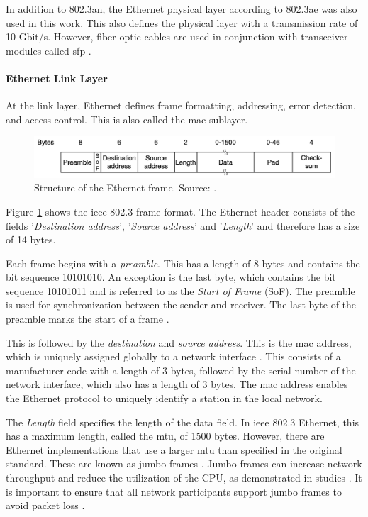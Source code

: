 In addition to 802.3an, the Ethernet physical layer according to 802.3ae was also used in this work. This also defines the physical layer with a transmission rate of 10 Gbit/s. However, fiber optic cables are used in conjunction with transceiver modules called \ac{sfp} \cite{10GigabitEthernet}.

\paragraph{Ethernet Link Layer} \label{chap:EthLinkLayer}
At the link layer, Ethernet defines frame formatting, addressing, error detection, and access control. This is also called the \ac{mac} sublayer.

\begin{figure}[h]
    \centering
    \includegraphics[width=1\linewidth]{figures/tcpip_refmodel/image5.png}
    \caption[Structure of the Ethernet frame]{Structure of the Ethernet frame. Source: \cite{Tanenbaum2010}.}
    \label{fig:EthernetFrame}
\end{figure}

Figure \ref{fig:EthernetFrame} shows the \ac{ieee} 802.3 frame format. The Ethernet header consists of the fields '\textit{Destination address}', '\textit{Source address}' and '\textit{Length}' and therefore has a size of 14 bytes.

Each frame begins with a \textit{preamble}. This has a length of 8 bytes and contains the bit sequence 10101010. An exception is the last byte, which contains the bit sequence 10101011 and is referred to as the \textit{Start of Frame} (SoF). The preamble is used for synchronization between the sender and receiver. The last byte of the preamble marks the start of a frame \cite{Tanenbaum2010}.

This is followed by the \textit{destination} and \textit{source address}. This is the \ac{mac} address, which is uniquely assigned globally to a network interface \cite{Weigel2021}. This consists of a manufacturer code with a length of 3 bytes, followed by the serial number of the network interface, which also has a length of 3 bytes. The \ac{mac} address enables the Ethernet protocol to uniquely identify a station in the local network.

The \textit{Length} field specifies the length of the data field. In \ac{ieee} 802.3 Ethernet, this has a maximum length, called the \ac{mtu}, of 1500 bytes. However, there are Ethernet implementations that use a larger \ac{mtu} than specified in the original standard. These are known as jumbo frames \cite{EthernetJumboFrames2009}. Jumbo frames can increase network throughput and reduce the utilization of the \ac{CPU}, as demonstrated in studies \cite{swsetup03}. It is important to ensure that all network participants support jumbo frames to avoid packet loss \cite{swsetup04}.


